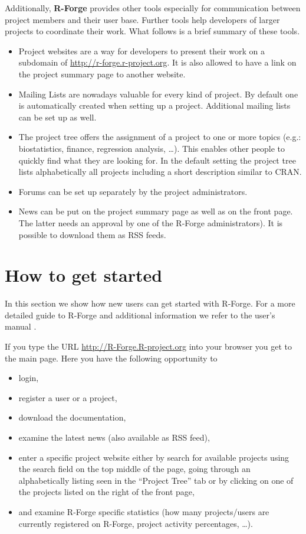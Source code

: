 Additionally, \textbf{R-Forge} provides other tools especially for
communication between project members and their user base. Further
tools help developers of larger projects to coordinate their work.
What follows is a brief summary of these tools.
\begin{itemize}
\item Project websites are a way for developers to present their work on a
subdomain of \url{http://r-forge.r-project.org}. It is also allowed to
have a link on the project summary page to another website. 
\item Mailing Lists are nowadays valuable for every kind of
  project. By default one is automatically created when setting up a
  project. Additional mailing lists can be set up as well. 
\item The project tree offers the assignment of a project to one or more
  topics (e.g.: biostatistics, finance, regression analysis,
  \ldots). This enables other people to quickly find what they are
  looking for. In the default setting the project tree lists
  alphabetically all projects including a short description similar to CRAN.
\item Forums can be set up separately by the project
  administrators.%
\item News can be put on the project summary page as well as on the
  front page. The latter needs an approval by one of the R-Forge
  administrators). It is possible to download them as RSS feeds.
\end{itemize}

\section{How to get started}
In this section we show how new users can get started with
R-Forge. For a more detailed guide to R-Forge and additional
information we refer to the user's manual
\citep{forge:theussl:2008}.

If you type the URL \url{http://R-Forge.R-project.org} into your
browser you get to the main page. Here you have the following
opportunity to
\begin{itemize}
\item login,
\item register a user or a project,
\item download the documentation,
\item examine the latest news (also available as RSS feed),
\item enter a specific project website either by search for available
  projects using the search field on the top middle of the page, going
  through an alphabetically listing seen in the
  ``Project Tree'' tab or by clicking on one of the projects listed on
  the right of the front page,
\item and examine R-Forge specific statistics (how many projects/users
  are currently registered on R-Forge, project activity percentages,
  \ldots{}).
\end{itemize}

